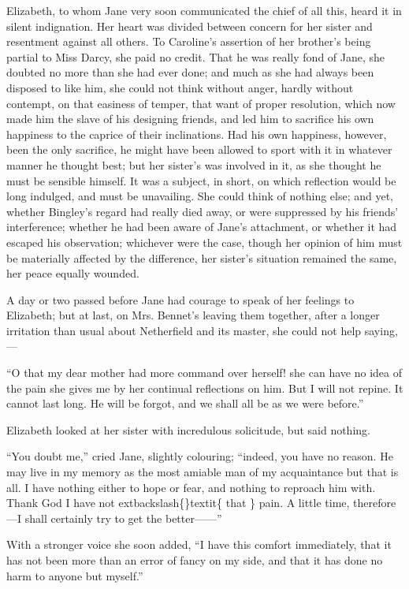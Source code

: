 \documentclass[10pt]{book}
\begin{document}
   Elizabeth, to whom Jane very soon communicated the chief of all this,
heard it in silent indignation. Her heart was divided between concern
for her sister and resentment against all others. To Caroline’s
assertion of her brother’s being partial to Miss Darcy, she paid no
credit. That he was really fond of Jane, she doubted no more than she
had ever done; and much as she had always been disposed to like him, she
could not think without anger, hardly without contempt, on that easiness
of temper, that want of proper resolution, which now made him the slave
of his designing friends, and led him to sacrifice his own happiness to
the caprice of their inclinations. Had his own happiness, however, been
the only sacrifice, he might have been allowed to sport with it in
whatever manner he thought best; but her sister’s was involved in it, as
she thought he must be sensible himself. It was a subject, in short, on
which reflection would be long indulged, and must be unavailing. She
could think of nothing else; and yet, whether Bingley’s regard had
really died away, or were suppressed by his friends’ interference;
whether he had been aware of Jane’s attachment, or whether it had
escaped his observation; whichever were the case, though her opinion of
him must be materially affected by the difference, her sister’s
situation remained the same, her peace equally wounded.
  

   A day or two passed before Jane had courage to speak of her feelings to
Elizabeth; but at last, on Mrs. Bennet’s leaving them together, after a
longer irritation than usual about Netherfield and its master, she could
not help saying,—
  

   “O that my dear mother had more command over herself! she can have no
idea of the pain she gives me by her continual reflections on him. But I
will not
   repine. It cannot last long. He will be forgot, and we shall
all be as we were before.”
  

   Elizabeth looked at her sister with incredulous solicitude, but said
nothing.
  

   “You doubt me,” cried Jane, slightly colouring; “indeed, you have no
reason. He may live in my memory as the most amiable man of my
acquaintance but that is all. I have nothing either to hope or fear, and
nothing to reproach him with. Thank God I have not
   	extbackslash\{\}textit\{
    that
   \}
   pain. A little
time, therefore—I shall certainly try to get the better——”
  

   With a stronger voice she soon added, “I have this comfort immediately,
that it has not been more than an error of fancy on my side, and that it
has done no harm to anyone but myself.”
  
\end{document}
